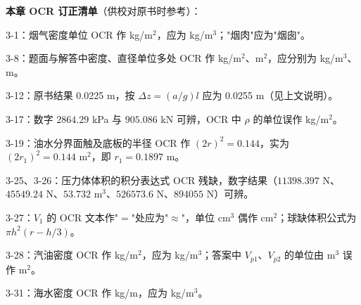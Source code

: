 \begin{tishi}
\textbf{本章 OCR 订正清单}（供校对原书时参考）：
\begin{xiaowen}
\item 3-1：烟气密度单位 OCR 作 kg/m$^2$，应为 kg/m$^3$；"烟肉"应为"烟囱"。
\item 3-8：题面与解答中密度、直径单位多处 OCR 作 kg/m$^2$、m$^2$，应分别为 kg/m$^3$、m。
\item 3-12：原书结果 0.0225 m，按 $\Delta z=(a/g)l$ 应为 0.0255 m（见上文说明）。
\item 3-17：数字 $2864.29$ kPa 与 $905.086$ kN 可辨，OCR 中 $\rho$ 的单位误作 kg/m$^2$。
\item 3-19：油水分界面触及底板的半径 OCR 作 $(2r)^2=0.144$，实为 $(2r_1)^2=0.144$ m$^2$，即 $r_1=0.1897$ m。
\item 3-25、3-26：压力体体积的积分表达式 OCR 残缺，数字结果（$11398.397$ N、$45549.24$ N、$53.732$ m$^3$、$526573.6$ N、$894055$ N）可辨。
\item 3-27：$V_1$ 的 OCR 文本作"$=$"处应为"$\approx$"，单位 cm$^3$ 偶作 cm$^2$；球缺体积公式为 $\pi h^2(r-h/3)$。
\item 3-28：汽油密度 OCR 作 kg/m$^2$，应为 kg/m$^3$；答案中 $V_{p1}$、$V_{p2}$ 的单位由 m$^3$ 误作 m$^2$。
\item 3-31：海水密度 OCR 作 kg/m，应为 kg/m$^3$。
\end{xiaowen}
\end{tishi}
